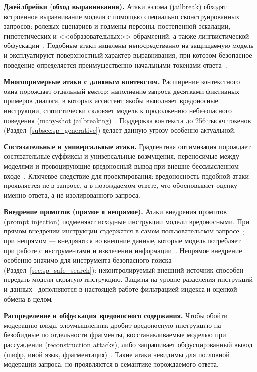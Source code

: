 \textbf{Джейлбрейки (обход выравнивания).} Атаки взлома (jailbreak) обходят встроенное выравнивание модели с помощью специально сконструированных запросов: ролевых сценариев и подмены персоны, постепенной эскалации, гипотетических и <<образовательных>> обрамлений, а также лингвистической обфускации~\cite{2407.01599,2406.14859}.
Подобные атаки нацелены непосредственно на защищаемую модель и эксплуатируют поверхностный характер выравнивания, при котором безопасное поведение определяется преимущественно начальными токенами ответа~\cite{2410.10862}.

\textbf{Многопримерные атаки с длинным контекстом.} Расширение контекстного окна порождает отдельный вектор: наполнение запроса десятками фиктивных примеров диалога, в которых ассистент якобы выполняет вредоносные инструкции, статистически склоняет модель к продолжению небезопасного поведения (many-shot jailbreaking)~\cite{anil2024manyshot}.
Поддержка контекста до 256 тысяч токенов (Раздел~\ref{subsec:sp_generative}) делает данную угрозу особенно актуальной.

\textbf{Состязательные и универсальные атаки.} Градиентная оптимизация порождает состязательные суффиксы и универсальные возмущения, переносимые между моделями и провоцирующие вредоносный вывод при внешне бессмысленном входе~\cite{2502.07987}.
Ключевое следствие для проектирования: вредоносность подобной атаки проявляется не в запросе, а в порождаемом ответе, что обосновывает оценку именно ответа, а не изолированного запроса.

\textbf{Внедрение промптов (прямое и непрямое).} Атаки внедрения промптов (prompt injection) подменяют исходные инструкции модели вредоносными.
При прямом внедрении инструкции содержатся в самом пользовательском запросе~\cite{2306.05499,2403.04957}; при непрямом --- внедряются во внешние данные, которые модель потребляет при работе с инструментами и извлечении информации~\cite{2312.14197,2501.18636}.
Непрямое внедрение особенно значимо для инструмента безопасного поиска (Раздел~\ref{sec:sp_safe_search}): неконтролируемый внешний источник способен передать модели скрытую инструкцию.
Защиты на уровне разделения инструкций и данных~\cite{2402.06363,2410.05451} дополняются в настоящей работе фильтрацией индекса и оценкой обмена в целом.

\textbf{Распределение и обфускация вредоносного содержания.} Чтобы обойти модерацию входа, злоумышленник дробит вредоносную инструкцию на безобидные по отдельности фрагменты, восстанавливаемые моделью при рассуждении (reconstruction attacks), либо запрашивает обфусцированный вывод (шифр, иной язык, фрагментация)~\cite{2506.16760,2412.00473}.
Такие атаки невидимы для пословной модерации запроса, но проявляются в семантике порождаемого ответа.

